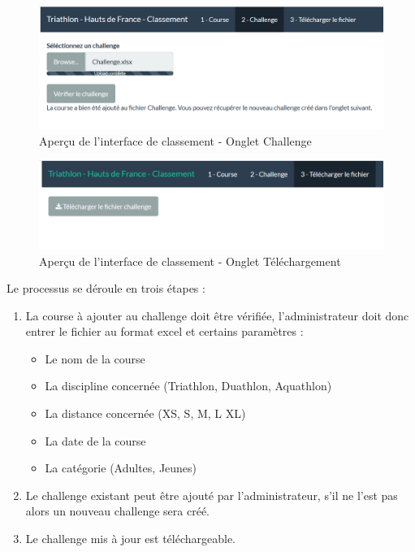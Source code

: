 \begin{figure}[!h]
	\center
	\includegraphics[scale=0.9]{img/ex_challenge.PNG}
	\caption {Aperçu de l'interface de classement - Onglet Challenge}
\end{figure}

\begin{figure}[!h]
	\center
	\includegraphics[scale=0.9]{img/ex_dl.PNG}
	\caption {Aperçu de l'interface de classement - Onglet Téléchargement}
\end{figure}

\newpage
Le processus se déroule en trois étapes :

\begin{enumerate} 
	\item La course à ajouter au challenge doit être vérifiée, l'administrateur doit donc entrer le fichier au format excel et certains paramètres :
	\begin{itemize} 
		\item Le nom de la course
		\item La discipline concernée (Triathlon, Duathlon, Aquathlon)
		\item La distance concernée (XS, S, M, L XL)
		\item La date de la course
		\item La catégorie (Adultes, Jeunes)
	\end{itemize}
	\item Le challenge existant peut être ajouté par l'administrateur, s'il ne l'est pas alors un nouveau challenge sera créé.
	\item Le challenge mis à jour est téléchargeable.
\end{enumerate}

